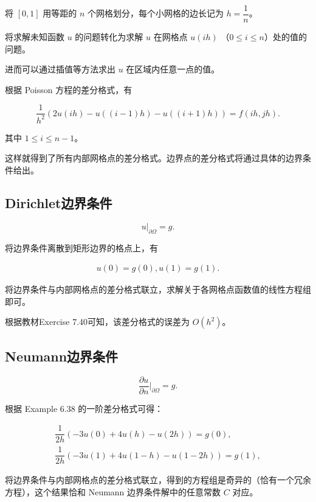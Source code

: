 \documentclass{ctexart}
\begin{document}
将 $[0,1]$ 用等距的 $n$ 个网格划分，每个小网格的边长记为 $h=\dfrac 1{n}$。

将求解未知函数 $u$ 的问题转化为求解 $u$ 在网格点 $u(ih)$ （$0\leq i\leq n$）处的值的问题。

进而可以通过插值等方法求出 $u$ 在区域内任意一点的值。

根据 Poisson 方程的差分格式，有

\begin{equation}
	\dfrac 1{h^2}(2u(ih)-u((i-1)h)-u((i+1)h)) = f(ih,jh).
\end{equation}

其中 $1\leq i\leq n-1$。

这样就得到了所有内部网格点的差分格式。边界点的差分格式将通过具体的边界条件给出。

\subsection{Dirichlet边界条件}

\begin{equation}
    u|_{\partial \Omega} = g.
\end{equation}

将边界条件离散到矩形边界的格点上，有

\begin{align}
	u(0) = g(0),u(1) = g(1).
\end{align}

将边界条件与内部网格点的差分格式联立，求解关于各网格点函数值的线性方程组即可。

根据教材Exercise 7.40可知，该差分格式的误差为 $O(h^2)$。

\subsection{Neumann边界条件}

\begin{equation}
    \dfrac{\partial u}{\partial n}|_{\partial \Omega} = g.
\end{equation}

根据 Example 6.38 的一阶差分格式可得：

\begin{align}
    \dfrac 1{2h}(-3u(0)+4u(h)-u(2h)) = g(0),\\
    \dfrac 1{2h}(-3u(1)+4u(1-h)-u(1-2h)) = g(1),
\end{align}

将边界条件与内部网格点的差分格式联立，得到的方程组是奇异的（恰有一个冗余方程），这个结果恰和 Neumann 边界条件解中的任意常数 $C$ 对应。
\end{document}
